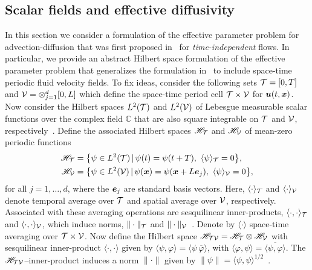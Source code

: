\documentclass[amsa]{ipart}
\begin{document}
\subsection{Scalar fields and effective diffusivity}\label{app:Scalar_Fields}
%
In this section we consider a formulation of the effective parameter
problem for advection-diffusion that was first
proposed in~\cite{Pavliotis:PHD_Thesis,Bhattacharya:AAP:1999:951} for
\emph{time-independent} 
flows. In particular, we provide an abstract Hilbert space formulation
of the effective parameter problem 
that generalizes the formulation in~\cite{Pavliotis:PHD_Thesis} to
include space-time periodic fluid velocity fields. To fix
ideas, consider the following sets $\mathcal{T}=[0,T]$ and
$\mathcal{V}=\otimes_{j=1}^d[0,L]$ which  define the space-time period cell
$\mathcal{T}\times\mathcal{V}$ for $\boldsymbol{u}(t,\boldsymbol{x})$. Now consider the Hilbert spaces
$L^2(\mathcal{T})$ and $L^2(\mathcal{V})$ of Lebesgue measurable scalar functions over the
complex field $\mathbb{C}$ that are also square integrable on $\mathcal{T}$
and $\mathcal{V}$, respectively~\cite{Folland:99:RealAnalysis}.  Define the
associated Hilbert spaces $\mathscr{H}_{\mathcal{T}}$ and $\mathscr{H}_{\mathcal{V}}$ of mean-zero
periodic functions
%
\begin{align}\label{eq:Hilbert_Spaces_scalar}  
  \Hs_{\Tc}&=\big\{\psi\in L^2(\Tc) \, | \, \psi(t)=\psi(t+T), \ \langle\psi\rangle_{\Tc}=0\big\},
  \\
  \Hs_{\Vc}&=\big\{\psi\in L^2(\Vc) \, | \, \psi(\vecx)=\psi(\vecx+L\vece_j), \ \langle\psi\rangle_{\Vc}=0\big\},
  \notag
\end{align}
%
for all $j=1,\ldots,d$, where the $\boldsymbol{e}_j$ are standard basis
vectors. Here, $\langle\cdot\rangle_{\mathcal{T}}$ and $\langle\cdot\rangle_{\mathcal{V}}$ denote temporal average
over $\mathcal{T}$ and spatial average over $\mathcal{V}$, respectively. Associated
with these averaging operations are sesquilinear inner-products,
$\langle\cdot,\cdot\rangle_{\mathcal{T}}$ and $\langle\cdot,\cdot\rangle_{\mathcal{V}}$, which induce norms, $\|\cdot\|_{\mathcal{T}}$ and
$\|\cdot\|_{\mathcal{V}}$~\cite{Folland:99:RealAnalysis}. Denote by $\langle\cdot\rangle$ space-time
averaging over $\mathcal{T}\times\mathcal{V}$. Now 
define the Hilbert space $\mathscr{H}_{\mathcal{T}\mathcal{V}}=\mathscr{H}_{\mathcal{T}}\otimes\mathscr{H}_{\mathcal{V}}$ with
sesquilinear inner-product $\langle\cdot,\cdot\rangle$ given by $\langle\psi,\varphi\rangle=\langle\psi\,\overline{\varphi}\rangle$,
with $\langle\varphi,\psi\rangle=\overline{\langle\psi,\varphi\rangle}$. The $\mathscr{H}_{\mathcal{T}\mathcal{V}}$--inner-product
induces a norm $\|\cdot\|$ given by
$\|\psi\|=\langle\psi,\psi\rangle^{1/2}$~\cite{Folland:99:RealAnalysis}.   
\end{document}
